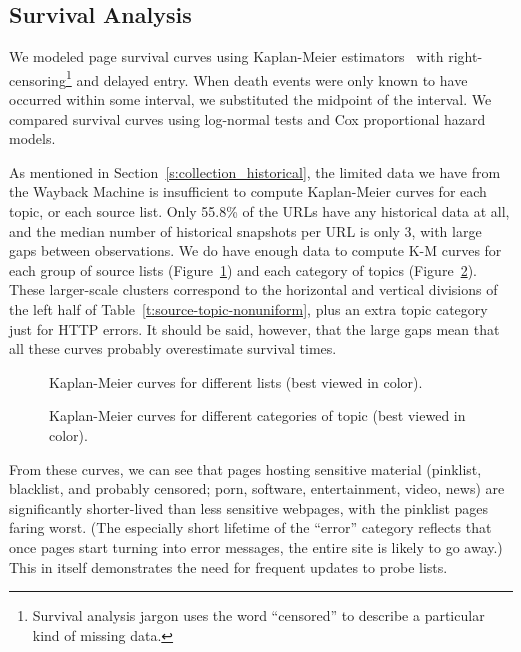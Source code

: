 \subsection{Survival Analysis}\label{s:survival}

\begin{figure*}[t!]
\centering\sffamily\relax
\caption{How likely pages are to be taken down compared to Common
  Crawl pages.  Error bars show 95\% confidence intervals.
}
  \label{fig:surv-oddsratio}
\end{figure*}

We modeled page survival curves using Kaplan-Meier
estimators~\cite{KM58} with right-censoring\footnote{Survival analysis
  jargon uses the word “censored” to describe a particular kind of
  missing data.}  and delayed entry. When death events were only known
to have occurred within some interval, we substituted the midpoint of
the interval.  We compared survival curves using log-normal tests and
Cox proportional hazard models.

As mentioned in Section~\ref{s:collection_historical}, the limited
data we have from the Wayback Machine is insufficient to compute
Kaplan-Meier curves for each topic, or each source list.  Only 55.8\%
of the URLs have any historical data at all, and the median number of
historical snapshots per URL is only 3, with large gaps between
observations.  We do have enough data to compute K-M curves for each
group of source lists (Figure~\ref{fig:km-list}) and each category of
topics (Figure~\ref{fig:km-topic}).  These larger-scale clusters
correspond to the horizontal and vertical divisions of the left half
of Table~\ref{t:source-topic-nonuniform}, plus an extra topic category
just for HTTP errors.  It should be said, however, that the large gaps
mean that all these curves probably overestimate survival times.

\begin{figure}[htb!]
\centering\sffamily\relax
\caption{Kaplan-Meier curves for different lists (best viewed in color).}
  \label{fig:km-list}
\end{figure}

\begin{figure}[htb!]
\centering\sffamily\relax
\caption{Kaplan-Meier curves for different categories of topic (best viewed in color).}
  \label{fig:km-topic}
\end{figure}

From these curves, we can see that pages hosting sensitive material
(pinklist, blacklist, and probably censored; porn, software,
entertainment, video, news) are significantly shorter-lived than less
sensitive webpages, with the pinklist pages faring worst.  (The
especially short lifetime of the “error” category reflects that once
pages start turning into error messages, the entire site is likely to
go away.)  This in itself demonstrates the need for frequent updates
to probe lists.

